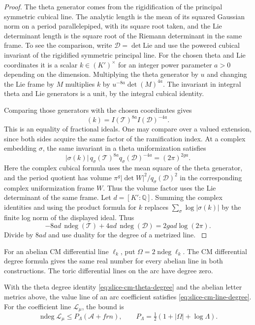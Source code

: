 \begin{proof}
The theta generator comes from the rigidification of
the principal symmetric cubical line. The analytic length
is the mean of its squared Gaussian norm on a period
parallelepiped, with its square root taken, and the Lie
determinant length is the square root of the Riemann
determinant in the same frame. To see the comparison, write
\(\mathcal D=\det\mathrm{Lie}\) and use the powered cubical invariant
of the rigidified symmetric principal line. For the chosen theta
and Lie coordinates it is a scalar \(k\in (K')^\times\) for an
integer power parameter \(a>0\) depending on the dimension.
Multiplying the theta generator by \(u\) and changing the Lie
frame by \(M\) multiplies \(k\) by \(u^{-8a}\det(M)^{4a}\).
The invariant in integral theta and Lie generators is a unit, by
the integral cubical identity.

Comparing those generators with
the chosen coordinates gives
\[
 (k)=I(\mathcal T)^{8a}I(\mathcal D)^{-4a}.
\]
This is an equality of fractional ideals. One may compare over a
valued extension, since both sides acquire the same factor of the
ramification index. At a complex embedding \(\sigma\), the same
invariant in a theta uniformization satisfies
\[
 |\sigma(k)|\,q_\sigma(\mathcal T)^{8a}
       q_\sigma(\mathcal D)^{-4a}=(2\pi)^{2ga}.
\]
Here the complex cubical formula uses the mean square of the theta
generator, and the period quotient has volume
\(\pi^g |\det W|^2/q_\sigma(\mathcal D)^2\) in the corresponding
complex uniformization frame \(W\). Thus the volume factor uses
the Lie determinant of the same frame. Let \(d=[K':\mathbb Q]\). Summing the complex identities and
using the product formula for \(k\) replaces
\(\sum_\sigma\log|\sigma(k)|\) by the finite log norm of the
displayed ideal. Thus
\[
      -8ad\,\operatorname{ndeg}(\mathcal T)
             +4ad\,\operatorname{ndeg}(\mathcal D)
             =2gad\log(2\pi).
\]
Divide by \(8ad\) and use duality for the degree of a
metrized line. \label{cor:slice-integral-norm-1}
\end{proof}

For an abelian CM differential line \(\ell_k\), put \(\Omega=2\operatorname{ndeg}\ell_k\). The CM differential degree formula gives the same real number for every abelian line in both constructions. The toric differential lines on the arc have degree zero.
\label{cor:slice-integral-norm-2}

\begin{lemma}\label{lem:cm-coefficient-line-degree}
With the theta degree identity \eqref{eq:slice-cm-theta-degree}
and the abelian letter metrics above, the value line of an arc
coefficient satisfies \eqref{eq:slice-cm-line-degree}. For the coefficient line \(\mathcal L_\mu\), the bound is
\[
 \operatorname{ndeg}\mathcal L_\mu\le P_\Lambda(\mathcal A+frn),\qquad P_\Lambda=\tfrac12(1+|\Omega|+\log\Lambda).
\]

\end{lemma}

